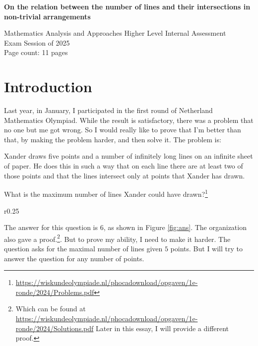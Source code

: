 \documentclass[a4paper, 12pt]{article}
\begin{document}
\begin{titlepage}
\begin{center}
\vspace*{4cm}
{\huge\textbf{On the relation between the number of lines and their intersections in non-trivial arrangements}}
\end{center}
\vspace{1cm}
\begin{flushright}
Mathematics Analysis and Approaches Higher Level Internal Assessment\\
Exam Session of 2025\\
Page count: 11 pages\\
\end{flushright}
\end{titlepage}

\tableofcontents
\clearpage

\section{Introduction}
Last year, in January, I participated in the first round of Netherland Mathematics Olympiad. While the result is satisfactory, there was a problem that no one but me got wrong. So I would really like to prove that I'm better than that, by making the problem harder, and then solve it.
The problem is:

\begin{displayquote}
Xander draws five points and a number of infinitely long lines on an infinite sheet of paper. He does this in such a way that on each line there are at least two of those points and that the lines intersect only at points that Xander has drawn.

What is the maximum number of lines Xander could have drawn?\footnote{\href{https://wiskundeolympiade.nl/phocadownload/opgaven/1e-ronde/2024/Problems.pdf}{https://wiskundeolympiade.nl/phocadownload/opgaven/1e-ronde/2024/Problems.pdf}}
\end{displayquote}

\begin{wrapfigure}{r}{0.25\textwidth}
    \vspace{-0.8\baselineskip}
    
    \caption{answer to the original problem}
    \label{fig:ans}
    \vspace{-1\baselineskip}
\end{wrapfigure}
The answer for this question is $6$, as shown in Figure \ref{fig:ans}. The organization also gave a proof.\footnote{Which can be found at \href{https://wiskundeolympiade.nl/phocadownload/opgaven/1e-ronde/2024/Solutions.pdf}{https://wiskundeolympiade.nl/phocadownload/opgaven/1e-ronde/2024/Solutions.pdf} Later in this essay, I will provide a different proof.}. But to prove my ability, I need to make it harder. The question asks for the maximal number of lines given $5$ points. But I will try to answer the question for any number of points.
\end{document}
